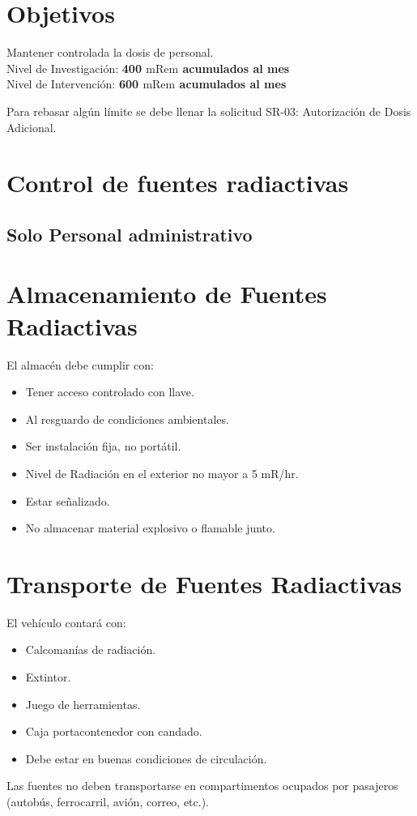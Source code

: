 \section*{Objetivos}
Mantener controlada la dosis de personal. \\
Nivel de Investigación: \textbf{400 $\text{mRem}$ acumulados al mes} \\
Nivel de Intervención: \textbf{600 $\text{mRem}$ acumulados al mes}

Para rebasar algún límite se debe llenar la solicitud SR-03: Autorización de Dosis Adicional.

\section*{Control de fuentes radiactivas}
\subsection*{Solo Personal administrativo}

\section*{Almacenamiento de Fuentes Radiactivas}
El almacén debe cumplir con:
\begin{itemize}
    \item Tener acceso controlado con llave.
    \item Al resguardo de condiciones ambientales.
    \item Ser instalación fija, no portátil.
    \item Nivel de Radiación en el exterior no mayor a 5 mR/hr.
    \item Estar señalizado.
    \item No almacenar material explosivo o flamable junto.
\end{itemize}

\section*{Transporte de Fuentes Radiactivas}
El vehículo contará con:
\begin{itemize}
    \item Calcomanías de radiación.
    \item Extintor.
    \item Juego de herramientas.
    \item Caja portacontenedor con candado.
    \item Debe estar en buenas condiciones de circulación.
\end{itemize}
Las fuentes no deben transportarse en compartimentos ocupados por pasajeros (autobús, ferrocarril, avión, correo, etc.).

